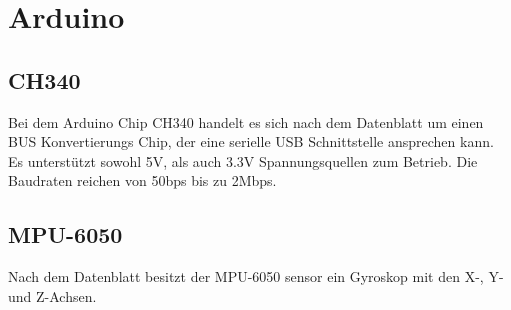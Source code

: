 \section{Arduino}


\subsection*{CH340}
Bei dem Arduino Chip CH340 handelt es sich nach dem Datenblatt \cite{CH340} um einen BUS Konvertierungs Chip, der eine serielle USB Schnittstelle ansprechen kann.
Es unterstützt sowohl 5V, als auch 3.3V Spannungsquellen zum Betrieb.
Die Baudraten reichen von 50bps bis zu 2Mbps.


\subsection*{MPU-6050}
Nach dem Datenblatt \cite{MPU6050} besitzt der MPU-6050 sensor ein Gyroskop mit den X-, Y- und Z-Achsen.
